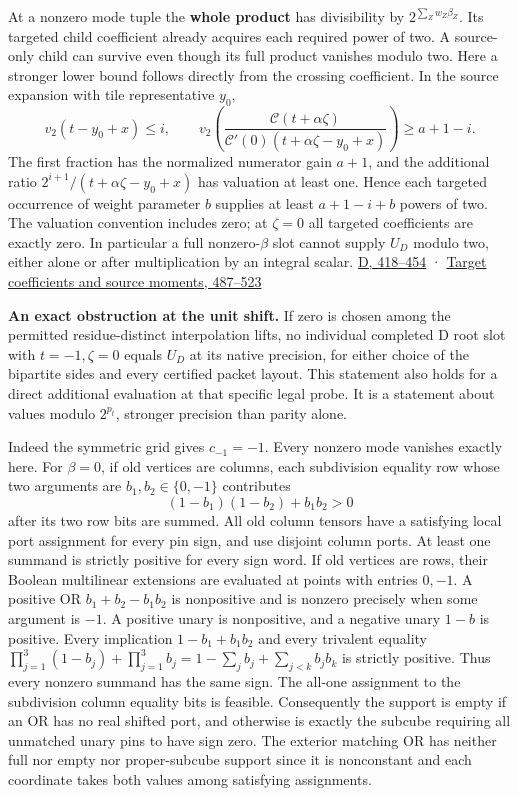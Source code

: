 \documentclass[
  11pt,
]{article}
\begin{document}
At a nonzero mode tuple the \textbf{whole product} has divisibility by
\(2^{\sum_Z w_Z\beta_Z}\). Its targeted child coefficient already
acquires each required power of two. A source-only child can survive
even though its full product vanishes modulo two. Here a stronger lower
bound follows directly from the crossing coefficient. In the source
expansion with tile representative \(y_0\), \[
 v_2(t-y_0+x)\le i,\qquad
 v_2\!\left(\frac{\mathcal C(t+\alpha\zeta)}
                  {\mathcal C'(0)(t+\alpha\zeta-y_0+x)}\right)
                 \ge a+1-i.
\] The first fraction has the normalized numerator gain \(a+1\), and the
additional ratio \(2^{i+1}/(t+\alpha\zeta-y_0+x)\) has valuation at
least one. Hence each targeted occurrence of weight parameter \(b\)
supplies at least \(a+1-i+b\) powers of two. The valuation convention
includes zero; at \(\zeta=0\) all targeted coefficients are exactly
zero. In particular a full nonzero-\(\beta\) slot cannot supply \(U_D\)
modulo two, either alone or after multiplication by an integral scalar.
\href{https://github.com/openai/math/blob/main/preprints/The-Exponential-Time-Hypothesis-is-False-October-25-2026/build/quantitative-contraction.tex\#L418}{D,
418--454} ·
\href{https://github.com/openai/math/blob/main/preprints/The-Exponential-Time-Hypothesis-is-False-October-25-2026/build/quantitative-contraction.tex\#L487}{Target
coefficients and source moments, 487--523}

\textbf{An exact obstruction at the unit shift.} If zero is chosen among
the permitted residue-distinct interpolation lifts, no individual
completed D root slot with \(t=-1,\zeta=0\) equals \(U_D\) at its native
precision, for either choice of the bipartite sides and every certified
packet layout. This statement also holds for a direct additional
evaluation at that specific legal probe. It is a statement about values
modulo \(2^{p_t}\), stronger precision than parity alone.

Indeed the symmetric grid gives \(c_{-1}=-1\). Every nonzero mode
vanishes exactly here. For \(\beta=0\), if old vertices are columns,
each subdivision equality row whose two arguments are
\(b_1,b_2\in\{0,-1\}\) contributes \[
 (1-b_1)(1-b_2)+b_1b_2>0
\] after its two row bits are summed. All old column tensors have a
satisfying local port assignment for every pin sign, and use disjoint
column ports. At least one summand is strictly positive for every sign
word. If old vertices are rows, their Boolean multilinear extensions are
evaluated at points with entries \(0,-1\). A positive OR
\(b_1+b_2-b_1b_2\) is nonpositive and is nonzero precisely when some
argument is \(-1\). A positive unary is nonpositive, and a negative
unary \(1-b\) is positive. Every implication \(1-b_1+b_1b_2\) and every
trivalent equality
\(\prod_{j=1}^3(1-b_j)+\prod_{j=1}^3b_j=1-\sum_j b_j+\sum_{j<k}b_jb_k\)
is strictly positive. Thus every nonzero summand has the same sign. The
all-one assignment to the subdivision column equality bits is feasible.
Consequently the support is empty if an OR has no real shifted port, and
otherwise is exactly the subcube requiring all unmatched unary pins to
have sign zero. The exterior matching OR has neither full nor empty nor
proper-subcube support since it is nonconstant and each coordinate takes
both values among satisfying assignments.
\end{document}
